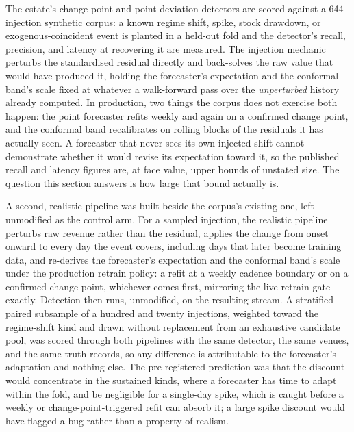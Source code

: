 The estate's change-point and point-deviation detectors are scored against a 644-injection
synthetic corpus: a known regime shift, spike, stock drawdown, or exogenous-coincident event is
planted in a held-out fold and the detector's recall, precision, and latency at recovering it are
measured. The injection mechanic perturbs the standardised residual directly and back-solves the
raw value that would have produced it, holding the forecaster's expectation and the conformal
band's scale fixed at whatever a walk-forward pass over the \emph{unperturbed} history already
computed. In production, two things the corpus does not exercise both happen: the point forecaster
refits weekly and again on a confirmed change point, and the conformal band recalibrates on rolling
blocks of the residuals it has actually seen. A forecaster that never sees its own injected shift
cannot demonstrate whether it would revise its expectation toward it, so the published recall and
latency figures are, at face value, upper bounds of unstated size. The question this section
answers is how large that bound actually is.

A second, realistic pipeline was built beside the corpus's existing one, left unmodified as the
control arm. For a sampled injection, the realistic pipeline perturbs raw revenue rather than the
residual, applies the change from onset onward to every day the event covers, including days that
later become training data, and re-derives the forecaster's expectation and the conformal band's
scale under the production retrain policy: a refit at a weekly cadence boundary or on a confirmed
change point, whichever comes first, mirroring the live retrain gate exactly. Detection then runs,
unmodified, on the resulting stream. A stratified paired subsample of a hundred and twenty
injections, weighted toward the regime-shift kind and drawn without replacement from an exhaustive
candidate pool, was scored through both pipelines with the same detector, the same venues, and the
same truth records, so any difference is attributable to the forecaster's adaptation and nothing
else. The pre-registered prediction was that the discount would concentrate in the sustained kinds,
where a forecaster has time to adapt within the fold, and be negligible for a single-day spike,
which is caught before a weekly or change-point-triggered refit can absorb it; a large spike
discount would have flagged a bug rather than a property of realism.

